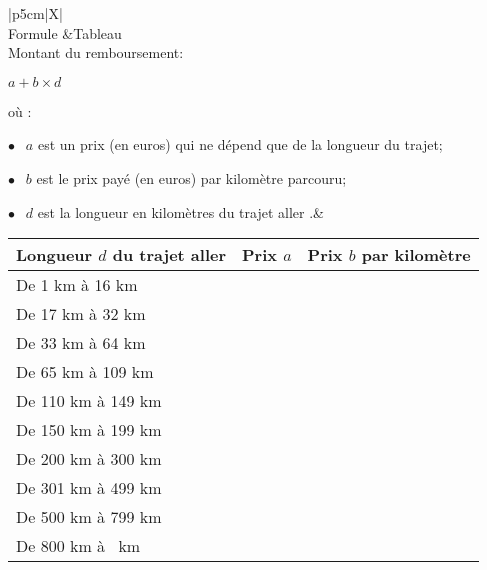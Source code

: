 \begin{center}
\begin{tabularx}{\linewidth}{|p{5cm}|X|}\hline
{}\\
Formule 		&Tableau\\
Montant du remboursement:

\qquad $a + b\times d$

où :

$\bullet~~$ $a$ est un prix (en euros) qui ne dépend que de la longueur du trajet;

$\bullet~~$ $b$ est le prix payé (en euros) par kilomètre parcouru;

$\bullet~~$ $d$ est la longueur en kilomètres du \og trajet aller \fg.&
\begin{tabular}{|m{3cm}|c| c|}\hline
Longueur $d$ du \og trajet aller\fg	&Prix $a$&Prix $b$ par kilomètre\\ \hline
 De 1 km à 16 km						&\np{0,7781}		&\np{0,1944}\\ \hline
 De 17 km à 32 km 						&\np{0,2503}		&\np{0,2165}\\ \hline
 De 33 km à 64 km 						&\np{2,0706}		&\np{0,1597}\\ \hline
 De 65 km à 109 km 						&\np{2,8891}		&\np{0,1489}\\ \hline
 De 110 km à 149 km 					&\np{4,0864}		&\np{0,1425}\\ \hline
 De 150 km à 199 km 					&\np{8,0871}		&\np{0,1193}\\ \hline
 De 200 km à 300 km 					&\np{7,7577}		&\np{0,1209}\\ \hline
 De 301 km à 499 km 					&\np{13,6514}	&\np{0,1030}\\ \hline
 De 500 km à 799 km 					&\np{18,4449}	&\np{0,0921}\\ \hline
 De 800 km à \np{9999}~km				&\np{32,2041}	&\np{0,0755}\\ \hline
\end{tabular} \\ \hline
\end{tabularx}
\end{center}
\medskip

